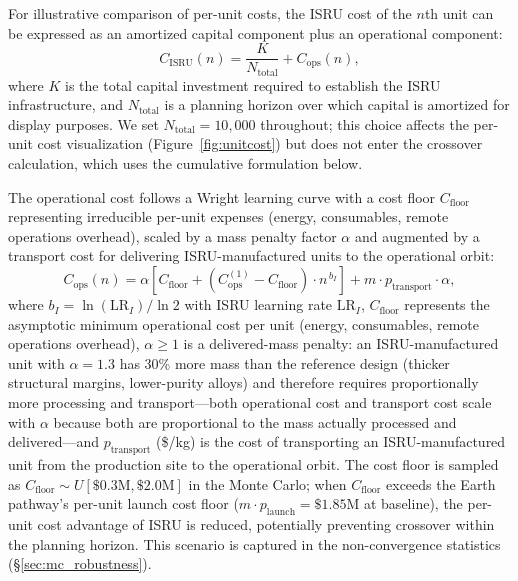 \documentclass[preprint,12pt]{elsarticle}
\begin{document}
For illustrative comparison of per-unit costs, the ISRU cost of the $n$th unit can be expressed as an amortized capital component plus an operational component:
\begin{equation}
  C_{\mathrm{ISRU}}(n) = \frac{K}{N_{\mathrm{total}}} + C_{\mathrm{ops}}(n),
  \label{eq:isru_unit}
\end{equation}
where $K$ is the total capital investment required to establish the ISRU infrastructure, and $N_{\mathrm{total}}$ is a planning horizon over which capital is amortized for display purposes. We set $N_{\mathrm{total}} = 10{,}000$ throughout; this choice affects the per-unit cost visualization (Figure~\ref{fig:unitcost}) but does not enter the crossover calculation, which uses the cumulative formulation below.

The operational cost follows a Wright learning curve with a cost floor $C_{\mathrm{floor}}$ representing irreducible per-unit expenses (energy, consumables, remote operations overhead), scaled by a mass penalty factor $\alpha$ and augmented by a transport cost for delivering ISRU-manufactured units to the operational orbit:
\begin{equation}
  C_{\mathrm{ops}}(n) = \alpha \left[ C_{\mathrm{floor}} + \left(C_{\mathrm{ops}}^{(1)} - C_{\mathrm{floor}}\right) \cdot n^{\,b_I} \right] + m \cdot p_{\mathrm{transport}} \cdot \alpha,
  \label{eq:isru_ops}
\end{equation}
where $b_I = \ln(\mathrm{LR}_I)/\ln 2$ with ISRU learning rate $\mathrm{LR}_I$, $C_{\mathrm{floor}}$ represents the asymptotic minimum operational cost per unit (energy, consumables, remote operations overhead), $\alpha \geq 1$ is a delivered-mass penalty: an ISRU-manufactured unit with $\alpha = 1.3$ has 30\% more mass than the reference design (thicker structural margins, lower-purity alloys) and therefore requires proportionally more processing and transport---both operational cost and transport cost scale with $\alpha$ because both are proportional to the mass actually processed and delivered---and $p_{\mathrm{transport}}$ (\$/kg) is the cost of transporting an ISRU-manufactured unit from the production site to the operational orbit. The cost floor is sampled as $C_{\mathrm{floor}} \sim U[\$0.3\text{M}, \$2.0\text{M}]$ in the Monte Carlo; when $C_{\mathrm{floor}}$ exceeds the Earth pathway's per-unit launch cost floor ($m \cdot p_{\mathrm{launch}} = \$1.85$M at baseline), the per-unit cost advantage of ISRU is reduced, potentially preventing crossover within the planning horizon. This scenario is captured in the non-convergence statistics (\S\ref{sec:mc_robustness}).
\end{document}
